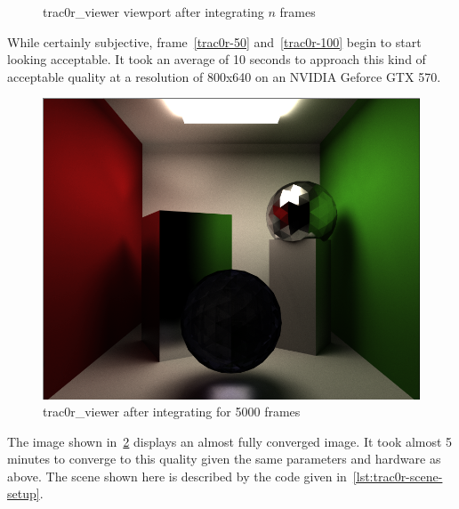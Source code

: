 \documentclass[
  twoside,
  11pt, a4paper,
  footinclude=true,
  headinclude=true,
  cleardoublepage=empty
]{scrreprt}
\begin{document}
\begin{figure}[H]
    \centering
    \caption{trac0r\_viewer viewport after integrating \(n\) frames}
    \label{fig:trac0r_n_frames}
\end{figure}

While certainly subjective, frame~\ref{trac0r-50} and~\ref{trac0r-100} begin to start looking
acceptable. It took an average of 10 seconds to approach this kind of acceptable quality at a
resolution of 800x640 on an NVIDIA Geforce GTX 570.

\begin{figure}[H]
    \includegraphics[scale=0.5]{trac0r-5000.png}
    \centering
    \caption{trac0r\_viewer after integrating for 5000 frames}
    \label{fig:trac0r-5000}
\end{figure}

The image shown in~\ref{fig:trac0r-5000} displays an almost fully converged image. It took almost 5
minutes to converge to this quality given the same parameters and hardware as above. The scene
shown here is described by the code given in~\ref{lst:trac0r-scene-setup}.
\end{document}
